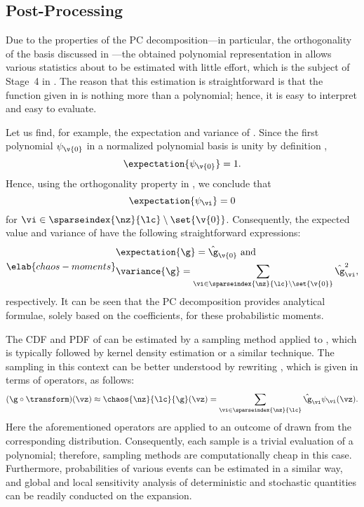 \subsection{Post-Processing}

Due to the properties of the \ac{PC} decomposition---in particular, the
orthogonality of the basis discussed in ---the obtained
polynomial representation in  allows various statistics
about \g to be estimated with little effort, which is the subject of Stage~4 in
. The reason that this estimation is straightforward is
that the function given in  is nothing more than a
polynomial; hence, it is easy to interpret and easy to evaluate.

Let us find, for example, the expectation and variance of \g. Since the first
polynomial $\psi_{\v{0}}$ in a normalized polynomial basis is unity by
definition \cite{xiu2010},
\[
  \expectation{\psi_{\v{0}}} = 1.
\]
Hence, using the orthogonality property in , we
conclude that
\[
  \expectation{\psi_{\vi}} = 0
\]
for $\vi \in \sparseindex{\nz}{\lc} \setminus \set{\v{0}}$. Consequently, the
expected value and variance of \g have the following straightforward
expressions:
\begin{equation} \elab{chaos-moments}
  \begin{split}
    & \expectation{\g} = \hat{\g}_{\v{0}} \text{ and} \\
    & \variance{\g} = \sum_{\vi \in \sparseindex{\nz}{\lc} \setminus \set{\v{0}}} \hat{\g}_{\vi}^2,
  \end{split}
\end{equation}
respectively. It can be seen that the \ac{PC} decomposition provides analytical
formulae, solely based on the coefficients, for these probabilistic moments.

The \ac{CDF} and \ac{PDF} of \g can be estimated by a sampling method applied to
, which is typically followed by kernel density estimation
\cite{hastie2013} or a similar technique. The sampling in this context can be
better understood by rewriting , which is given in terms
of operators, as follows:
\[
  (\g \circ \transform)(\vz) \approx \chaos{\nz}{\lc}{\g}(\vz)
  = \sum_{\vi \in \sparseindex{\nz}{\lc}} \hat{\g}_{\vi} \psi_{\vi}(\vz).
\]
Here the aforementioned operators are applied to an outcome of \vz drawn from
the corresponding distribution. Consequently, each sample is a trivial
evaluation of a polynomial; therefore, sampling methods are computationally
cheap in this case. Furthermore, probabilities of various events can be
estimated in a similar way, and global and local sensitivity analysis of
deterministic and stochastic quantities can be readily conducted on the
expansion.

